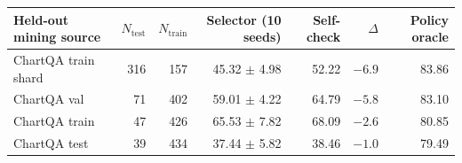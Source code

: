 \begin{tabular}{lrrrrrr}
\toprule
Held-out mining source & $N_{\text{test}}$ & $N_{\text{train}}$ & Selector (10 seeds) & Self-check & $\Delta$ & Policy oracle \\
\midrule
ChartQA train shard & 316 & 157 & 45.32 $\pm$ 4.98 & 52.22 & $-6.9$ & 83.86 \\
ChartQA val & 71 & 402 & 59.01 $\pm$ 4.22 & 64.79 & $-5.8$ & 83.10 \\
ChartQA train & 47 & 426 & 65.53 $\pm$ 7.82 & 68.09 & $-2.6$ & 80.85 \\
ChartQA test & 39 & 434 & 37.44 $\pm$ 5.82 & 38.46 & $-1.0$ & 79.49 \\
\bottomrule
\end{tabular}
